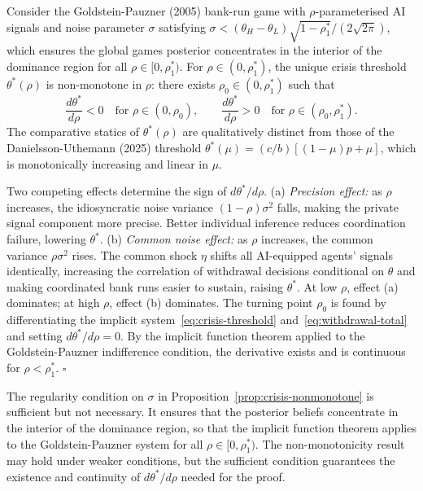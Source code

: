 \begin{proposition}\label{prop:crisis-nonmonotone}
  Consider the Goldstein-Pauzner (2005) bank-run game with $\rho$-parameterised AI signals and noise parameter $\sigma$ satisfying $\sigma < (\theta_H - \theta_L)\sqrt{1-\rho_1^*}/(2\sqrt{2\pi})$, which ensures the global games posterior concentrates in the interior of the dominance region for all $\rho \in [0, \rho_1^*)$. For $\rho \in (0, \rho_1^*)$, the unique crisis threshold $\theta^*(\rho)$ is non-monotone in $\rho$: there exists $\rho_0 \in (0, \rho_1^*)$ such that
  \begin{equation}\label{eq:theta-star-monotonicity}
    \frac{d\theta^*}{d\rho} < 0 \quad \text{for } \rho \in (0, \rho_0), \qquad
    \frac{d\theta^*}{d\rho} > 0 \quad \text{for } \rho \in (\rho_0, \rho_1^*).
  \end{equation}
  The comparative statics of $\theta^*(\rho)$ are qualitatively distinct from those of the Danielsson-Uthemann (2025) threshold $\theta^*(\mu) = (c/b)[(1-\mu)p + \mu]$, which is monotonically increasing and linear in $\mu$.

   Two competing effects determine the sign of $d\theta^*/d\rho$. (a) \emph{Precision effect:} as $\rho$ increases, the idiosyncratic noise variance $(1-\rho)\sigma^2$ falls, making the private signal component more precise. Better individual inference reduces coordination failure, lowering $\theta^*$. (b) \emph{Common noise effect:} as $\rho$ increases, the common variance $\rho\sigma^2$ rises. The common shock $\eta$ shifts all AI-equipped agents' signals identically, increasing the correlation of withdrawal decisions conditional on $\theta$ and making coordinated bank runs easier to sustain, raising $\theta^*$. At low $\rho$, effect (a) dominates; at high $\rho$, effect (b) dominates. The turning point $\rho_0$ is found by differentiating the implicit system~\eqref{eq:crisis-threshold} and~\eqref{eq:withdrawal-total} and setting $d\theta^*/d\rho = 0$. By the implicit function theorem applied to the Goldstein-Pauzner indifference condition, the derivative exists and is continuous for $\rho < \rho_1^*$. $\square$
\end{proposition}

The regularity condition on $\sigma$ in Proposition~\ref{prop:crisis-nonmonotone} is sufficient but not necessary. It ensures that the posterior beliefs concentrate in the interior of the dominance region, so that the implicit function theorem applies to the Goldstein-Pauzner system for all $\rho \in [0, \rho_1^*)$. The non-monotonicity result may hold under weaker conditions, but the sufficient condition guarantees the existence and continuity of $d\theta^*/d\rho$ needed for the proof.

